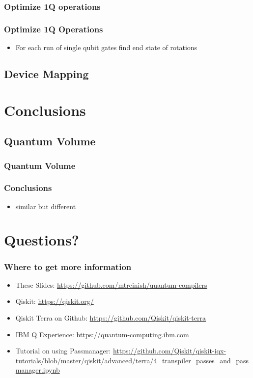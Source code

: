 \documentclass[aspectratio=169,11pt,hyperref={colorlinks=true}]{beamer}
\begin{document}
\subsubsection{Optimize 1Q operations}
\begin{frame}
    \frametitle{Optimize 1Q Operations}
    \begin{itemize}
        \item For each run of single qubit gates find end state of rotations
    \end{itemize}
\end{frame}

\subsection{Device Mapping}

\section{Conclusions}
\subsection{Quantum Volume}
\begin{frame}
    \frametitle{Quantum Volume\footnotemark[1]}

    \vspace{3em}
\end{frame}
\begin{frame}
    \frametitle{Conclusions}
    \begin{itemize}
        \item similar but different
    \end{itemize}
\end{frame}

\section{Questions?}
\begin{frame}
\frametitle{Where to get more information}
    \begin{itemize}
        \item These Slides: \href{https://github.com/mtreinish/quantum-compilers}{https://github.com/mtreinish/quantum-compilers}
        \item Qiskit: \href{https://qiskit.org/}{https://qiskit.org/}
        \item Qiskit Terra on Github: \href{https://github.com/Qiskit/qiskit-terra}{https://github.com/Qiskit/qiskit-terra}
        \item IBM Q Experience: \href{https://quantum-computing.ibm.com}{https://quantum-computing.ibm.com}
        \item Tutorial on using Passmanager: {\small \href{https://github.com/Qiskit/qiskit-iqx-tutorials/blob/master/qiskit/advanced/terra/4\_transpiler\_passes\_and\_passmanager.ipynb}{https://github.com/Qiskit/qiskit-iqx-tutorials/blob/master/qiskit/advanced/terra/4\_transpiler\_passes\_and\_passmanager.ipynb}}
    \end{itemize}
\end{frame}
\end{document}
